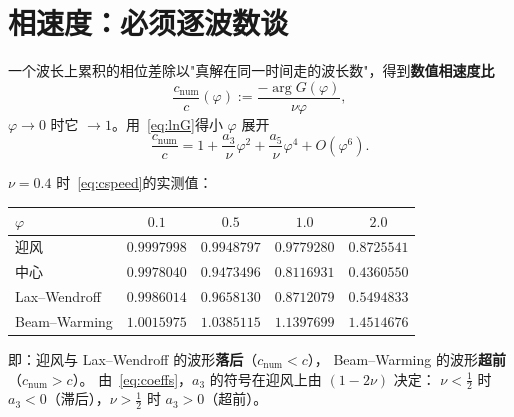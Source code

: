 \section{相速度：必须逐波数谈}
\label{sec:disp}

\begin{definition}[数值相速度]
\label{def:cspeed}
一个波长上累积的相位差除以"真解在同一时间走的波长数"，得到\textbf{数值相速度比}
\begin{equation}
  \frac{c_{\text{num}}}{c}(\varphi):=\frac{-\arg G(\varphi)}{\nu\varphi},
  \label{eq:cspeed}
\end{equation}
$\varphi\to0$ 时它 $\to1$。用~\eqref{eq:lnG}得小 $\varphi$ 展开
\begin{equation}
  \frac{c_{\text{num}}}{c}=1+\frac{a_3}{\nu}\varphi^2+\frac{a_5}{\nu}\varphi^4+O(\varphi^6).
  \label{eq:csexp}
\end{equation}
\end{definition}

\begin{theorem}[相位误差的符号与大小]
\label{thm:phase}
$\nu=0.4$ 时~\eqref{eq:cspeed}的实测值：

\begin{center}
\begin{tabular}{lcccc}
\hline
$\varphi$ & $0.1$ & $0.5$ & $1.0$ & $2.0$\\
\hline
迎风 & $0.9997998$ & $0.9948797$ & $0.9779280$ & $0.8725541$\\
中心 & $0.9978040$ & $0.9473496$ & $0.8116931$ & $0.4360550$\\
Lax--Wendroff & $0.9986014$ & $0.9658130$ & $0.8712079$ & $0.5494833$\\
Beam--Warming & $1.0015975$ & $1.0385115$ & $1.1397699$ & $1.4514676$\\
\hline
\end{tabular}
\end{center}

即：迎风与 Lax--Wendroff 的波形\textbf{落后}（$c_{\text{num}}<c$），
Beam--Warming 的波形\textbf{超前}（$c_{\text{num}}>c$）。
由~\eqref{eq:coeffs}，$a_3$ 的符号在迎风上由 $(1-2\nu)$ 决定：
$\nu<\tfrac12$ 时 $a_3<0$（滞后），$\nu>\tfrac12$ 时 $a_3>0$（超前）。
\end{theorem}

